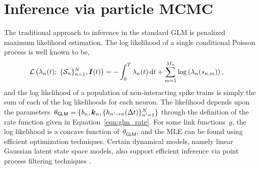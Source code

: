 \section{Inference via particle MCMC}
The traditional approach to inference in the standard GLM is penalized
maximum likelihood estimation. The log likelihood of a single
conditional Poisson process is well known to be,
\begin{align}
\label{eqn:glm_lkhd}
\mathcal{L}\left(\lambda_n(t);\;\{\mathcal{S}_n\}_{n=1}^N, \boldsymbol{I}(t)\right)
&= -\int_0^T \lambda_n(t)\,\mathrm{d} t + \sum_{m=1}^{M_n} \log\left(\lambda_n(s_{n,m})\right),
\end{align}
and the log likelihood of a population of non-interacting spike trains
is simply the sum of each of the log likelihoods for each neuron. The
likelihood depends upon the
parameters~${\theta_{\mathsf{GLM}}=\{b_n,\boldsymbol{k}_n, \{h_{n'\to n}(\Delta
  t)\}_{n'=1}^N\}}$ through the definition of the rate function given
in Equation~\ref{eqn:glm_rate}. For some link functions~$g$, the log
likelihood is a concave function of~$\theta_{\mathsf{GLM}}$, and the
MLE can be found using efficient optimization techniques. Certain
dynamical models, namely linear Gaussian latent state space models,
also support efficient inference via point process filtering
techniques \cite{Smith-2003}.

